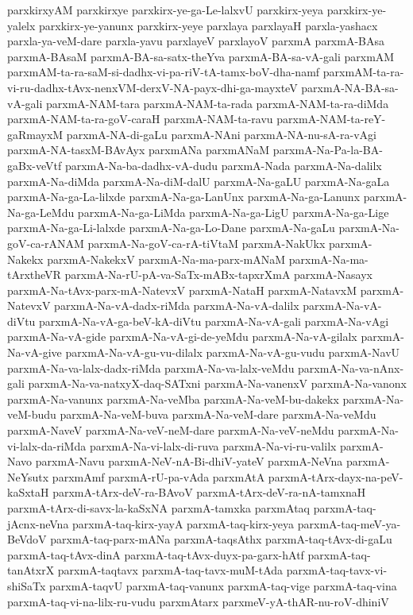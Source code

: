 {parxkirxyAM
parxkirxye
parxkirx-ye-ga-Le-lalxvU
parxkirx-yeya
parxkirx-ye-yalelx
parxkirx-ye-yanunx
parxkirx-yeye
parxlaya
parxlayaH
parxla-yashacx
parxla-ya-veM-dare
parxla-yavu
parxlayeV
parxlayoV
parxmA
parxmA-BAsa
parxmA-BAsaM
parxmA-BA-sa-satx-theYva
parxmA-BA-sa-vA-gali
parxmAM
parxmAM-ta-ra-saM-si-dadhx-vi-pa-riV-tA-tamx-boV-dha-namf
parxmAM-ta-ra-vi-ru-dadhx-tAvx-nenxVM-derxV-NA-payx-dhi-ga-mayxteV
parxmA-NA-BA-sa-vA-gali
parxmA-NAM-tara
parxmA-NAM-ta-rada
parxmA-NAM-ta-ra-diMda
parxmA-NAM-ta-ra-goV-caraH
parxmA-NAM-ta-ravu
parxmA-NAM-ta-reY-gaRmayxM
parxmA-NA-di-gaLu
parxmA-NAni
parxmA-NA-nu-sA-ra-vAgi
parxmA-NA-tasxM-BAvAyx
parxmANa
parxmANaM
parxmA-Na-Pa-la-BA-gaBx-veVtf
parxmA-Na-ba-dadhx-vA-dudu
parxmA-Nada
parxmA-Na-dalilx
parxmA-Na-diMda
parxmA-Na-diM-dalU
parxmA-Na-gaLU
parxmA-Na-gaLa
parxmA-Na-ga-La-lilxde
parxmA-Na-ga-LanUnx
parxmA-Na-ga-Lanunx
parxmA-Na-ga-LeMdu
parxmA-Na-ga-LiMda
parxmA-Na-ga-LigU
parxmA-Na-ga-Lige
parxmA-Na-ga-Li-lalxde
parxmA-Na-ga-Lo-Dane
parxmA-Na-gaLu
parxmA-Na-goV-ca-rANAM
parxmA-Na-goV-ca-rA-tiVtaM
parxmA-NakUkx
parxmA-Nakekx
parxmA-NakekxV
parxmA-Na-ma-parx-mANaM
parxmA-Na-ma-tArxtheVR
parxmA-Na-rU-pA-va-SaTx-mABx-tapxrXmA
parxmA-Nasayx
parxmA-Na-tAvx-parx-mA-NatevxV
parxmA-NataH
parxmA-NatavxM
parxmA-NatevxV
parxmA-Na-vA-dadx-riMda
parxmA-Na-vA-dalilx
parxmA-Na-vA-diVtu
parxmA-Na-vA-ga-beV-kA-diVtu
parxmA-Na-vA-gali
parxmA-Na-vAgi
parxmA-Na-vA-gide
parxmA-Na-vA-gi-de-yeMdu
parxmA-Na-vA-gilalx
parxmA-Na-vA-give
parxmA-Na-vA-gu-vu-dilalx
parxmA-Na-vA-gu-vudu
parxmA-NavU
parxmA-Na-va-lalx-dadx-riMda
parxmA-Na-va-lalx-veMdu
parxmA-Na-va-nAnx-gali
parxmA-Na-va-natxyX-daq-SATxni
parxmA-Na-vanenxV
parxmA-Na-vanonx
parxmA-Na-vanunx
parxmA-Na-veMba
parxmA-Na-veM-bu-dakekx
parxmA-Na-veM-budu
parxmA-Na-veM-buva
parxmA-Na-veM-dare
parxmA-Na-veMdu
parxmA-NaveV
parxmA-Na-veV-neM-dare
parxmA-Na-veV-neMdu
parxmA-Na-vi-lalx-da-riMda
parxmA-Na-vi-lalx-di-ruva
parxmA-Na-vi-ru-valilx
parxmA-Navo
parxmA-Navu
parxmA-NeV-nA-Bi-dhiV-yateV
parxmA-NeVna
parxmA-NeYsutx
parxmAmf
parxmA-rU-pa-vAda
parxmAtA
parxmA-tArx-dayx-na-peV-kaSxtaH
parxmA-tArx-deV-ra-BAvoV
parxmA-tArx-deV-ra-nA-tamxnaH
parxmA-tArx-di-savx-la-kaSxNA
parxmA-tamxka
parxmAtaq
parxmA-taq-jAcnx-neVna
parxmA-taq-kirx-yayA
parxmA-taq-kirx-yeya
parxmA-taq-meV-ya-BeVdoV
parxmA-taq-parx-mANa
parxmA-taqsAthx
parxmA-taq-tAvx-di-gaLu
parxmA-taq-tAvx-dinA
parxmA-taq-tAvx-duyx-pa-garx-hAtf
parxmA-taq-tanAtxrX
parxmA-taqtavx
parxmA-taq-tavx-muM-tAda
parxmA-taq-tavx-vi-shiSaTx
parxmA-taqvU
parxmA-taq-vanunx
parxmA-taq-vige
parxmA-taq-vina
parxmA-taq-vi-na-lilx-ru-vudu
parxmAtarx
parxmeV-yA-thAR-nu-roV-dhiniV
}
